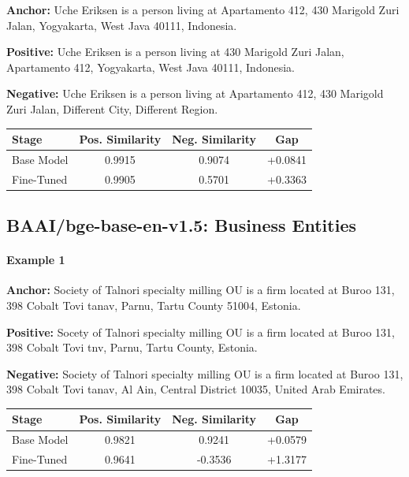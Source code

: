 \documentclass{article}
\begin{document}
\textbf{Anchor:} Uche Eriksen is a person living at Apartamento 412, 430 Marigold Zuri Jalan, Yogyakarta, West Java 40111, Indonesia.

\textbf{Positive:} Uche Eriksen is a person living at 430 Marigold Zuri Jalan, Apartamento 412, Yogyakarta, West Java 40111, Indonesia.

\textbf{Negative:} Uche Eriksen is a person living at Apartamento 412, 430 Marigold Zuri Jalan, Different City, Different Region.

\begin{center}
\small
\begin{tabular}{lccc}
\toprule
Stage & Pos. Similarity & Neg. Similarity & Gap \\
\midrule
Base Model & 0.9915 & 0.9074 & +0.0841 \\
Fine-Tuned & 0.9905 & 0.5701 & +0.3363 \\
\bottomrule
\end{tabular}
\end{center}


\subsection{BAAI/bge-base-en-v1.5: Business Entities}

\paragraph{Example 1}

\textbf{Anchor:} Society of Talnori specialty milling OU is a firm located at Buroo 131, 398 Cobalt Tovi tanav, Parnu, Tartu County 51004, Estonia.

\textbf{Positive:} Socety of Talnori specialty milling OU is a firm located at Buroo 131, 398 Cobalt Tovi tnv, Parnu, Tartu County, Estonia.

\textbf{Negative:} Society of Talnori specialty milling OU is a firm located at Buroo 131, 398 Cobalt Tovi tanav, Al Ain, Central District 10035, United Arab Emirates.

\begin{center}
\small
\begin{tabular}{lccc}
\toprule
Stage & Pos. Similarity & Neg. Similarity & Gap \\
\midrule
Base Model & 0.9821 & 0.9241 & +0.0579 \\
Fine-Tuned & 0.9641 & -0.3536 & +1.3177 \\
\bottomrule
\end{tabular}
\end{center}
\end{document}
